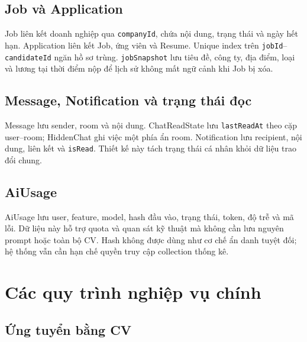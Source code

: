 \subsection{Job và Application}

Job liên kết doanh nghiệp qua \texttt{companyId}, chứa nội dung, trạng thái và ngày hết hạn. Application liên kết Job, ứng viên và Resume. Unique index trên \texttt{jobId}--\texttt{candidateId} ngăn hồ sơ trùng. \texttt{jobSnapshot} lưu tiêu đề, công ty, địa điểm, loại và lương tại thời điểm nộp để lịch sử không mất ngữ cảnh khi Job bị xóa.

\subsection{Message, Notification và trạng thái đọc}

Message lưu sender, room và nội dung. ChatReadState lưu \texttt{lastReadAt} theo cặp user--room; HiddenChat ghi việc một phía ẩn room. Notification lưu recipient, nội dung, liên kết và \texttt{isRead}. Thiết kế này tách trạng thái cá nhân khỏi dữ liệu trao đổi chung.

\subsection{AiUsage}

AiUsage lưu user, feature, model, hash đầu vào, trạng thái, token, độ trễ và mã lỗi. Dữ liệu này hỗ trợ quota và quan sát kỹ thuật mà không cần lưu nguyên prompt hoặc toàn bộ CV. Hash không được dùng như cơ chế ẩn danh tuyệt đối; hệ thống vẫn cần hạn chế quyền truy cập collection thống kê.

\section{Các quy trình nghiệp vụ chính}

\subsection{Ứng tuyển bằng CV}

